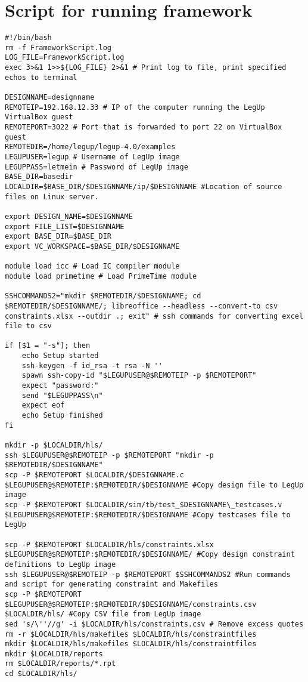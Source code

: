 \section{\label{sec:hlsscriptsourcecode}Script for running framework}
\lstset{language=[gnu] make, style=Cstyle, morestring=[s]""}
\begin{lstlisting}[caption={HLS Script source code},label=lst:hlsscriptsourcecode]
#!/bin/bash
rm -f FrameworkScript.log
LOG_FILE=FrameworkScript.log
exec 3>&1 1>>${LOG_FILE} 2>&1 # Print log to file, print specified echos to terminal

DESIGNNAME=designname
REMOTEIP=192.168.12.33 # IP of the computer running the LegUp VirtualBox guest
REMOTEPORT=3022 # Port that is forwarded to port 22 on VirtualBox guest
REMOTEDIR=/home/legup/legup-4.0/examples
LEGUPUSER=legup # Username of LegUp image
LEGUPPASS=letmein # Password of LegUp image
BASE_DIR=basedir
LOCALDIR=$BASE_DIR/$DESIGNNAME/ip/$DESIGNNAME #Location of source files on Linux server.

export DESIGN_NAME=$DESIGNNAME
export FILE_LIST=$DESIGNNAME
export BASE_DIR=$BASE_DIR
export VC_WORKSPACE=$BASE_DIR/$DESIGNNAME

module load icc # Load IC compiler module
module load primetime # Load PrimeTime module

SSHCOMMANDS2="mkdir $REMOTEDIR/$DESIGNNAME; cd $REMOTEDIR/$DESIGNNAME/; libreoffice --headless --convert-to csv constraints.xlsx --outdir .; exit" # ssh commands for converting excel file to csv

if [$1 = "-s"]; then
	echo Setup started
	ssh-keygen -f id_rsa -t rsa -N ''
	spawn ssh-copy-id "$LEGUPUSER@$REMOTEIP -p $REMOTEPORT"
	expect "password:"
	send "$LEGUPPASS\n"
	expect eof
	echo Setup finished
fi

mkdir -p $LOCALDIR/hls/
ssh $LEGUPUSER@$REMOTEIP -p $REMOTEPORT "mkdir -p $REMOTEDIR/$DESIGNNAME"
scp -P $REMOTEPORT $LOCALDIR/$DESIGNNAME.c $LEGUPUSER@$REMOTEIP:$REMOTEDIR/$DESIGNNAME #Copy design file to LegUp image
scp -P $REMOTEPORT $LOCALDIR/sim/tb/test_$DESIGNNAME\_testcases.v $LEGUPUSER@$REMOTEIP:$REMOTEDIR/$DESIGNNAME #Copy testcases file to LegUp

scp -P $REMOTEPORT $LOCALDIR/hls/constraints.xlsx $LEGUPUSER@$REMOTEIP:$REMOTEDIR/$DESIGNNAME/ #Copy design constraint definitions to LegUp image
ssh $LEGUPUSER@$REMOTEIP -p $REMOTEPORT $SSHCOMMANDS2 #Run commands and script for generating constraint and Makefiles
scp -P $REMOTEPORT $LEGUPUSER@$REMOTEIP:$REMOTEDIR/$DESIGNNAME/constraints.csv $LOCALDIR/hls/ #Copy CSV file from LegUp image
sed 's/\''//g' -i $LOCALDIR/hls/constraints.csv # Remove excess quotes
rm -r $LOCALDIR/hls/makefiles $LOCALDIR/hls/constraintfiles
mkdir $LOCALDIR/hls/makefiles $LOCALDIR/hls/constraintfiles
mkdir $LOCALDIR/reports
rm $LOCALDIR/reports/*.rpt
cd $LOCALDIR/hls/


\end{lstlisting}
